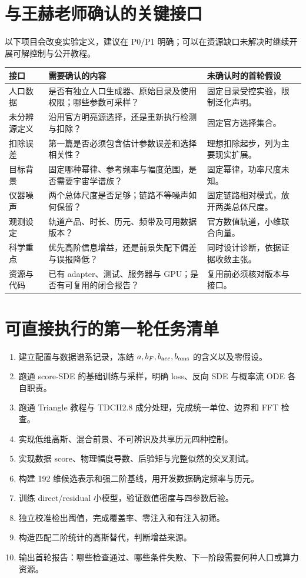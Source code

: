 \documentclass[UTF8,fontset=fandol,a4paper,11pt]{ctexart}
\numberwithin{equation}{section}
\begin{document}
\section{与王赫老师确认的关键接口}
以下项目会改变实验定义，建议在 P0/P1 明确；可以在资源缺口未解决时继续开展可解控制与公开教程。
\par\noindent\begin{minipage}{\linewidth}\centering
\begin{tabular}{P{3.3cm}P{6.1cm}P{4.8cm}}
\toprule 接口 & 需要确认的内容 & 未确认时的首轮假设\\\midrule
人口数据 & 是否有独立人口生成器、原始目录及使用权限；哪些参数可采样？ & 固定目录受控实验，限制泛化声明。\\
未分辨源定义 & 沿用官方明亮源选择，还是重新执行检测与扣除？ & 固定官方选择集合。\\
扣除误差 & 第一篇是否必须包含估计参数误差和选择相关性？ & 理想扣除起步，列为主要现实扩展。\\
目标背景 & 固定哪种幂律、参考频率与幅度范围，是否需要宇宙学谱族？ & 固定幂律，功率尺度未知。\\
仪器噪声 & 两个总体尺度是否足够；链路不等噪声如何保留？ & 固定链路相对模式，放开两类总体尺度。\\
观测设定 & 轨道产品、时长、历元、频带及可用数据版本？ & 官方数值轨道，小维联合向量。\\
科学重点 & 优先高阶信息增益，还是前景失配下偏差与误报降低？ & 同时设计诊断，依据证据收敛主张。\\
资源与代码 & 已有 adapter、测试、服务器与 GPU；是否有可复用的闭合报告？ & 复用前必须核对版本与接口。\\\bottomrule
\end{tabular}
\end{minipage}\par\smallskip

\section{可直接执行的第一轮任务清单}
\begin{enumerate}
\item 建立配置与数据谱系记录，冻结 $a,b_F,b_{\rm acc},b_{\rm oms}$ 的含义以及零假设。
\item 跑通 score-SDE 的基础训练与采样，明确 loss、反向 SDE 与概率流 ODE 各自职责。
\item 跑通 Triangle 教程与 TDCII2.8 成分处理，完成统一单位、边界和 FFT 检查。
\item 实现低维高斯、混合前景、不可辨识及共享历元四种控制。
\item 实现数据 score、物理幅度导数、后验矩与完整似然的交叉测试。
\item 构建 192 维候选表示和强二阶基线，用开发数据确定频率与历元。
\item 训练 direct/residual 小模型，验证数值密度与四参数后验。
\item 独立校准检出阈值，完成覆盖率、零注入和有注入初筛。
\item 构造匹配二阶统计的高斯替代，判断增益来源。
\item 输出首轮报告：哪些检查通过、哪些条件失败、下一阶段需要何种人口或算力资源。
\end{enumerate}
\end{document}
